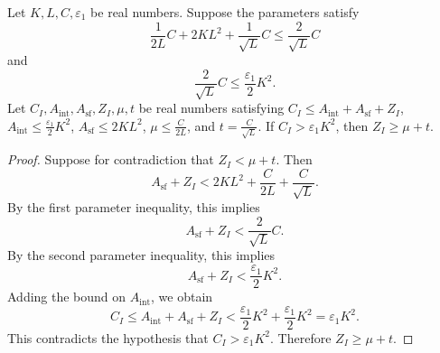 \begin{helper}
Let \(K, L, C, \varepsilon_1\) be real numbers. Suppose the parameters satisfy
\[
\frac{1}{2L} C + 2K L^2 + \frac{1}{\sqrt L} C \le \frac{2}{\sqrt L} C
\]
and
\[
\frac{2}{\sqrt L} C \le \frac{\varepsilon_1}{2} K^2.
\]
Let \(C_I, A_{\mathrm{int}}, A_{\mathrm{sf}}, Z_I, \mu, t\) be real numbers satisfying \(C_I \le A_{\mathrm{int}} + A_{\mathrm{sf}} + Z_I\), \(A_{\mathrm{int}} \le \frac{\varepsilon_1}{2} K^2\), \(A_{\mathrm{sf}} \le 2K L^2\), \(\mu \le \frac{C}{2L}\), and \(t = \frac{C}{\sqrt L}\). If \(C_I > \varepsilon_1 K^2\), then \(Z_I \ge \mu + t\).
\end{helper}
\begin{proof}
Suppose for contradiction that \(Z_I < \mu + t\). Then
\[
A_{\mathrm{sf}} + Z_I < 2K L^2 + \frac{C}{2L} + \frac{C}{\sqrt L}.
\]
By the first parameter inequality, this implies
\[
A_{\mathrm{sf}} + Z_I < \frac{2}{\sqrt L} C.
\]
By the second parameter inequality, this implies
\[
A_{\mathrm{sf}} + Z_I < \frac{\varepsilon_1}{2} K^2.
\]
Adding the bound on \(A_{\mathrm{int}}\), we obtain
\[
C_I \le A_{\mathrm{int}} + A_{\mathrm{sf}} + Z_I < \frac{\varepsilon_1}{2} K^2 + \frac{\varepsilon_1}{2} K^2 = \varepsilon_1 K^2.
\]
This contradicts the hypothesis that \(C_I > \varepsilon_1 K^2\). Therefore \(Z_I \ge \mu + t\).
\end{proof}
